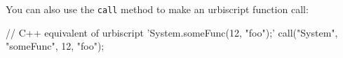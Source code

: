 You can also use the \lstinline{call} method to make an urbiscript function
call:

\begin{urbiunchecked}
// C++ equivalent of urbiscript 'System.someFunc(12, "foo");'
call("System", "someFunc", 12, "foo");
\end{urbiunchecked}



